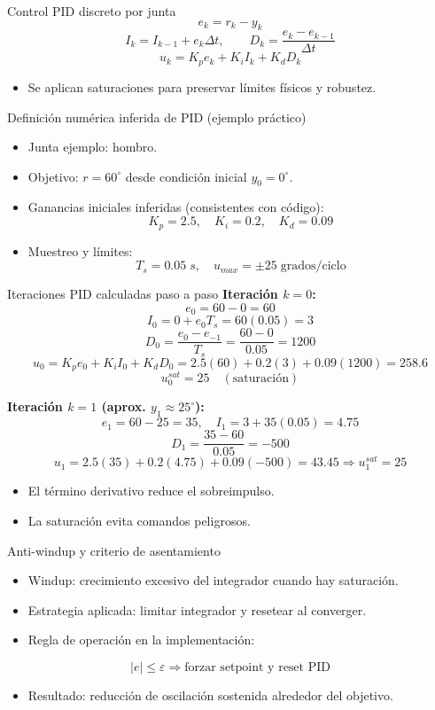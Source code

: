 \documentclass[aspectratio=169]{beamer}
\begin{document}
\begin{frame}{Control PID discreto por junta}
\[
e_k = r_k - y_k
\]
\[
I_k = I_{k-1} + e_k\Delta t,\qquad D_k = \frac{e_k-e_{k-1}}{\Delta t}
\]
\[
u_k = K_p e_k + K_i I_k + K_d D_k
\]
\begin{itemize}
  \item Se aplican saturaciones para preservar límites físicos y robustez.
\end{itemize}
\end{frame}

\begin{frame}{Definición numérica inferida de PID (ejemplo práctico)}
\begin{itemize}
  \item Junta ejemplo: hombro.
  \item Objetivo: $r=60^\circ$ desde condición inicial $y_0=0^\circ$.
  \item Ganancias iniciales inferidas (consistentes con código):
\[
K_p=2.5,\quad K_i=0.2,\quad K_d=0.09
\]
  \item Muestreo y límites:
\[
T_s=0.05\;s,\quad u_{max}=\pm 25\;\text{grados/ciclo}
\]
\end{itemize}
\end{frame}

\begin{frame}{Iteraciones PID calculadas paso a paso}
\textbf{Iteración $k=0$:}
\[
e_0 = 60-0=60
\]
\[
I_0 = 0 + e_0T_s = 60(0.05)=3
\]
\[
D_0 = \frac{e_0-e_{-1}}{T_s}=\frac{60-0}{0.05}=1200
\]
\[
u_0 = K_pe_0 + K_iI_0 + K_dD_0
=2.5(60)+0.2(3)+0.09(1200)=258.6
\]
\[
u_0^{sat}=25\quad(\text{saturación})
\]

\textbf{Iteración $k=1$ (aprox. $y_1\approx 25^\circ$):}
\[
e_1=60-25=35,\quad I_1=3+35(0.05)=4.75
\]
\[
D_1=\frac{35-60}{0.05}=-500
\]
\[
u_1=2.5(35)+0.2(4.75)+0.09(-500)=43.45\Rightarrow u_1^{sat}=25
\]
\begin{itemize}
  \item El término derivativo reduce el sobreimpulso.
  \item La saturación evita comandos peligrosos.
\end{itemize}
\end{frame}

\begin{frame}{Anti-windup y criterio de asentamiento}
\begin{itemize}
  \item Windup: crecimiento excesivo del integrador cuando hay saturación.
  \item Estrategia aplicada: limitar integrador y resetear al converger.
  \item Regla de operación en la implementación:
\end{itemize}
\[
|e|\leq \varepsilon \Rightarrow \text{forzar setpoint y reset PID}
\]
\begin{itemize}
  \item Resultado: reducción de oscilación sostenida alrededor del objetivo.
\end{itemize}
\end{frame}
\end{document}
